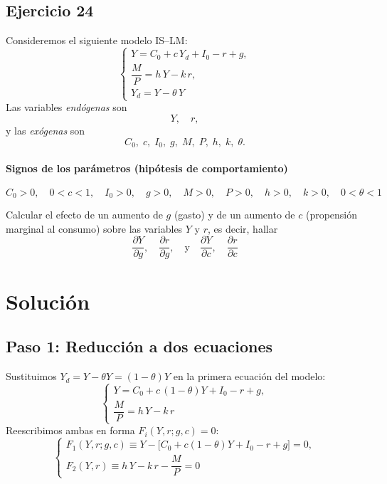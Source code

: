 \documentclass{article}
\begin{document}
\subsection{Ejercicio 24}

Consideremos el siguiente modelo IS--LM:
\[
\begin{cases}
Y = C_0 + c\,Y_d + I_0 - r + g,\\[6pt]
\dfrac{M}{P} = h\,Y - k\,r,\\[4pt]
Y_d = Y - \theta\,Y
\end{cases}
\]
Las variables \emph{endógenas} son
\[
Y,\quad r,
\]
y las \emph{exógenas} son
\[
C_0,\;c,\;I_0,\;g,\;M,\;P,\;h,\;k,\;\theta.
\]

\medskip

\paragraph{Signos de los parámetros (hipótesis de comportamiento)}  
\[
C_0 > 0,\quad 0 < c < 1,
\quad I_0 > 0,\quad g > 0,
\quad M > 0,\quad P > 0,
\quad h > 0,\quad k > 0,
\quad 0 < \theta < 1
\]

Calcular el efecto de un aumento de \(g\) (gasto) y de un aumento de \(c\) (propensión marginal al consumo) sobre las variables \(Y\) y \(r\), es decir, hallar
\[
\frac{\partial Y}{\partial g},\quad \frac{\partial r}{\partial g},
\quad\text{y}\quad
\frac{\partial Y}{\partial c},\quad \frac{\partial r}{\partial c}
\]

\newpage
\section*{Solución}

\subsection*{Paso 1: Reducción a dos ecuaciones}

Sustituimos \(Y_d=Y-\theta Y=(1-\theta)Y\) en la primera ecuación del modelo:
\[
\begin{cases}
Y = C_0 + c\,(1-\theta)Y + I_0 - r + g,\\[4pt]
\dfrac{M}{P} = h\,Y - k\,r
\end{cases}
\]
Reescribimos ambas en forma \(F_i(Y,r;g,c)=0\):
\[
\begin{cases}
F_1(Y,r;g,c)\equiv Y - \bigl[C_0 + c(1-\theta)Y + I_0 - r + g\bigr]=0,\\[6pt]
F_2(Y,r)\equiv h\,Y - k\,r - \dfrac{M}{P}=0
\end{cases}
\]
\end{document}
